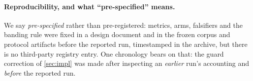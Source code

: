 \paragraph{Reproducibility, and what ``pre-specified'' means.}
We say \emph{pre-specified} rather than pre-registered: metrics, arms,
falsifiers and the banding rule were fixed in a design document and in the
frozen corpus and protocol artifacts before the reported run, timestamped in
the archive, but there is no third-party registry entry. One chronology bears
on that: the guard correction of \cref{sec:impl} was made after inspecting an
\emph{earlier} run's accounting and \emph{before} the reported run.
